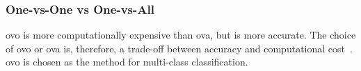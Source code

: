 \subsubsection{One-vs-One vs One-vs-All}\label{subsubsec:one-vs-one-vs-one-vs-all}
\gls{ovo} is more computationally expensive than \gls{ova}, but is more accurate. The choice of \gls{ovo} or \gls{ova} is, therefore, a trade-off between accuracy and computational cost~\cite{james-statistical-learning1}. \gls{ovo} is chosen as the method for multi-class classification. 

